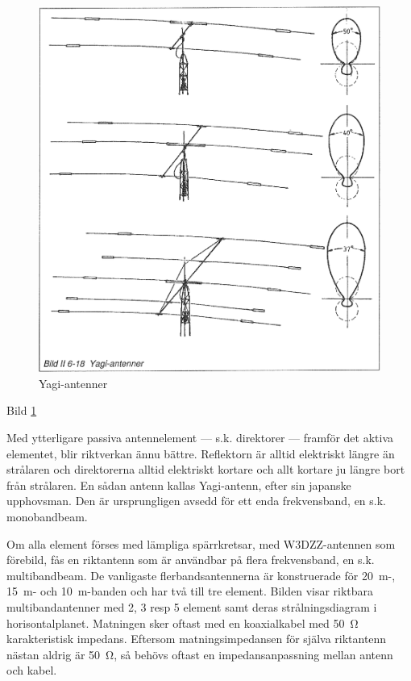 \begin{figure}
  \includegraphics[width=\textwidth]{images/bild_2_6-18}
  \caption{Yagi-antenner}
  \label{fig:bildII6-18}
\end{figure}

Bild \ref{fig:bildII6-18}

Med ytterligare passiva antennelement --- s.k. direktorer --- framför det
aktiva elementet, blir riktverkan ännu bättre. Reflektorn är alltid
elektriskt längre än strålaren och direktorerna alltid elektriskt
kortare och allt kortare ju längre bort från strålaren. En sådan
antenn kallas Yagi-antenn, efter sin japanske upphovsman. Den är
ursprungligen avsedd för ett enda frekvensband, en s.k. monobandbeam.

Om alla element förses med lämpliga spärrkretsar, med W3DZZ-antennen
som förebild, fås en riktantenn som är användbar på flera
frekvensband, en s.k. multibandbeam. De vanligaste flerbandsantennerna
är konstruerade för 20~m-, 15~m- och 10~m-banden och har två till tre
element.  Bilden visar riktbara multibandantenner med 2, 3 resp 5
element samt deras strålningsdiagram i horisontalplanet.  Matningen
sker oftast med en koaxialkabel med 50~Ω karakteristisk
impedans. Eftersom matningsimpedansen för själva riktantenn nästan
aldrig är 50~Ω, så behövs oftast en impedansanpassning mellan antenn
och kabel.

